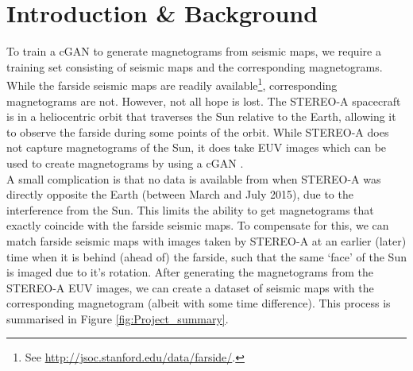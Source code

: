 \documentclass[11pt,a4paper,onecolumn]{report}
\begin{document}
%
%
%
%
\chapter{Introduction \& Background}
%
%
%
%



%
%

To train a cGAN to generate magnetograms from seismic maps, we require
a training set consisting of seismic maps and the corresponding magnetograms.
While the farside seismic maps are readily available\footnote{See
\url{http://jsoc.stanford.edu/data/farside/}.}, corresponding magnetograms are
not. However, not all hope is lost. The STEREO-A spacecraft is in a heliocentric
orbit that traverses the Sun relative to the Earth, allowing it to observe the
farside during some points of the orbit. While STEREO-A does not capture
magnetograms of the Sun, it does take EUV images which can be used to create
magnetograms by using a cGAN \citep{Kim2019}.\\

A small complication is that no data is available from when STEREO-A was
directly opposite the Earth (between March and July 2015), due to the
interference from the Sun. This limits the ability to get magnetograms that
exactly coincide with the farside seismic maps. To compensate for this, we can
match farside seismic maps with images taken by STEREO-A at an earlier (later)
time when it is behind (ahead of) the farside, such that the same `face' of the
Sun is imaged due to it's rotation. After generating the magnetograms from the
STEREO-A EUV images, we can create a dataset of seismic maps with the
corresponding magnetogram (albeit with some time difference). This process is
summarised in Figure \ref{fig:Project_summary}.\\
\end{document}
